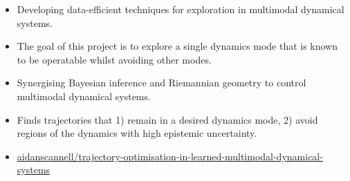 \documentclass[10pt,a4paper,ragged2e,withhyper]{altacv}
\begin{document}
\begin{paracol}{2}
\label{sec:orgec06d61}
\nocite{*}
\printbibliography[heading=pubtype,title={\printinfo{\faUsers}{Conference Proceedings}},type=inproceedings]

\label{sec:org8999906}

\begin{itemize}
\item Developing data-efficient techniques for exploration in multimodal dynamical systems.
\item The goal of this project is to explore a single dynamics mode that is known to be operatable whilst avoiding other modes.
\end{itemize}


\newpage

\label{sec:org8a43f82}

\begin{itemize}
\item Synergising Bayesian inference and Riemannian geometry to control multimodal dynamical systems.
\item Finds trajectories that 1) remain in a desired dynamics mode, 2) avoid regions of the dynamics with high epistemic uncertainty.
\item \href{https://github.com/aidanscannell/trajectory-optimisation-in-learned-multimodal-dynamical-systems}{\faGithub aidanscannell/trajectory-optimisation-in-learned-multimodal-dynamical-systems}
\end{itemize}

\par\divider


\end{paracol}
\end{document}
